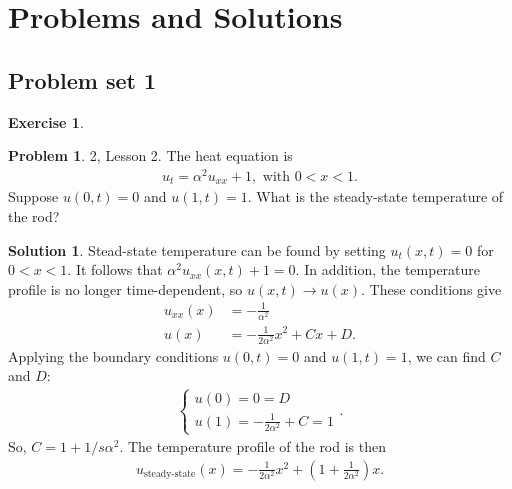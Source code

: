 \documentclass{article}
\theoremstyle{definition}
\newtheorem*{prob*}{Problem}
\newtheorem*{exer*}{Exercise}
\newtheorem*{sln*}{Solution}
\begin{document}
\newpage

\section{Problems and Solutions}
\subsection{Problem set 1}
\begin{exer*}
	\begin{prob*}2, Lesson 2.
		The heat equation is
		\begin{align*}
		u_t = \alpha^2 u_{xx} + 1, \text{ with }0 < x < 1.
		\end{align*}
		Suppose $u(0,t) = 0$ and $u(1,t) = 1$. What is the steady-state temperature of the rod?\\
		\begin{sln*}
			Stead-state temperature can be found by setting $u_t(x,t) = 0$ for $0 < x < 1$. It follows that $\alpha^2 u_{xx}(x,t) + 1 = 0$. In addition, the temperature profile is no longer time-dependent, so $u(x,t)\to u(x)$. These conditions give
			\begin{align*}
			u_{xx}(x) &= -\frac{1}{\alpha^2}\\
			u(x) &= -\frac{1}{2\alpha^2}x^2 + Cx + D.
			\end{align*} 
			Applying the boundary conditions $u(0,t)=0$ and $u(1,t)=1$, we can find $C$ and $D$:
			\begin{align*}
			\begin{cases}
			u(0) = 0 = D\\
			u(1) = -\frac{1}{2\alpha^2} + C = 1
			\end{cases}.
			\end{align*}
			So, $C = 1 + 1/s\alpha^2$. The temperature profile of the rod is then
			\begin{align*}
			u_{\text{steady-state}}(x) = -\frac{1}{2\alpha^2}x^2 + \left(1 + \frac{1}{2\alpha^2} \right)x .
			\end{align*}
		\end{sln*}
	\end{prob*}
	
	\newpage
	

\end{exer*}
\end{document}
